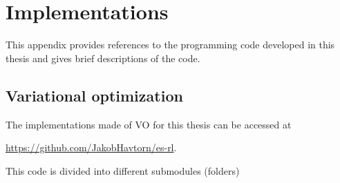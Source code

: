 
\chapter{Implementations}\label{app: implementations of algorithms}
This appendix provides references to the programming code developed in this thesis and gives brief descriptions of the code.

\section{Variational optimization}
The implementations made of \gls{VO} for this thesis can be accessed at
\begin{center}
    \url{https://github.com/JakobHavtorn/es-rl}. 
\end{center}
This code is divided into different submodules (folders)
